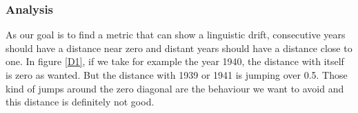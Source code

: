 \subsubsection{Analysis}

As our goal is to find a metric that can show a linguistic drift, consecutive years should have a distance near zero and distant years should have a distance close to one. In figure \ref{D1}, if we take for example the year 1940, the distance with itself is zero as wanted. But the distance with 1939 or 1941 is jumping over 0.5. Those kind of jumps around the zero diagonal are the behaviour we want to avoid and this distance is definitely not good.
